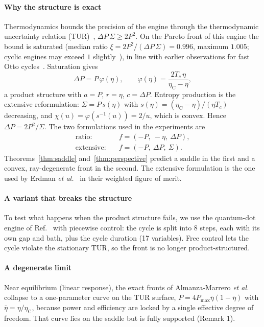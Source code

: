 \documentclass[journal]{IEEEtran}
\theoremstyle{remark}
\newcommand{\etaC}{\eta_{\mathrm{C}}}
\begin{document}
\paragraph*{Why the structure is exact}
Thermodynamics bounds the precision of the engine through the thermodynamic uncertainty relation
(TUR)~\cite{Barato2015,Gingrich2016,Pietzonka2018}, $\Delta P\,\Sigma \ge 2P^2$. On the Pareto front of
this engine the bound is saturated (median ratio $\xi = 2P^2/(\Delta P\,\Sigma) = 0.996$, maximum
$1.005$; cyclic engines may exceed $1$ slightly~\cite{Holubec2018}), in line with earlier
observations for fast Otto cycles~\cite{Erdman2023}. Saturation gives
\begin{equation}
\Delta P = P\,\varphi(\eta), \qquad \varphi(\eta) = \frac{2T_c\,\eta}{\etaC - \eta},
\end{equation}
a product structure with $a = P$, $r = \eta$, $c = \Delta P$. Entropy production is the extensive
reformulation: $\Sigma = P\,s(\eta)$ with $s(\eta) = (\etaC - \eta)/(\eta T_c)$ decreasing, and
$\chi(u) = \varphi(s^{-1}(u)) = 2/u$, which is convex. Hence $\Delta P = 2P^2/\Sigma$. The two
formulations used in the experiments are
\begin{align}
\text{ratio:}\quad & f = (-P,\ -\eta,\ \Delta P),\\
\text{extensive:}\quad & f = (-P,\ \Delta P,\ \Sigma).
\end{align}
Theorems~\ref{thm:saddle} and~\ref{thm:perspective} predict a saddle in the first and a convex,
ray-degenerate front in the second. The extensive formulation is the one used by Erdman
\emph{et al.}~\cite{Erdman2023} in their weighted figure of merit.

\paragraph*{A variant that breaks the structure}
To test what happens when the product structure fails, we use the quantum-dot engine of
Ref.~\cite{Erdman2023} with piecewise control: the cycle is split into 8 steps, each with its own gap
and bath, plus the cycle duration (17 variables). Free control lets the cycle violate the stationary
TUR, so the front is no longer product-structured.

\paragraph*{A degenerate limit}
\label{sec:lr}
Near equilibrium (linear response), the exact fronts of Almanza-Marrero
\emph{et al.}~\cite{Almanza2026} collapse to a one-parameter curve on the TUR surface,
$P = 4P_{\max}\bar\eta(1 - \bar\eta)$ with $\bar\eta = \eta/\etaC$, because power and efficiency are
locked by a single effective degree of freedom. That curve lies on the saddle but is fully supported
(Remark 1).
\end{document}
